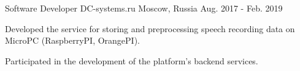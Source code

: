 \begin{cventries}
  \cventry
    {Software Developer} %
    {DC-systems.ru} %
    {Moscow, Russia} %
    {Aug. 2017 - Feb. 2019} %
    {
      \begin{cvitems} %
        \item {Developed the service for storing and preprocessing speech recording data on MicroPC (RaspberryPI, OrangePI).}
        \item {Participated in the development of the platform's backend services.}
      \end{cvitems}
    }

\end{cventries}
